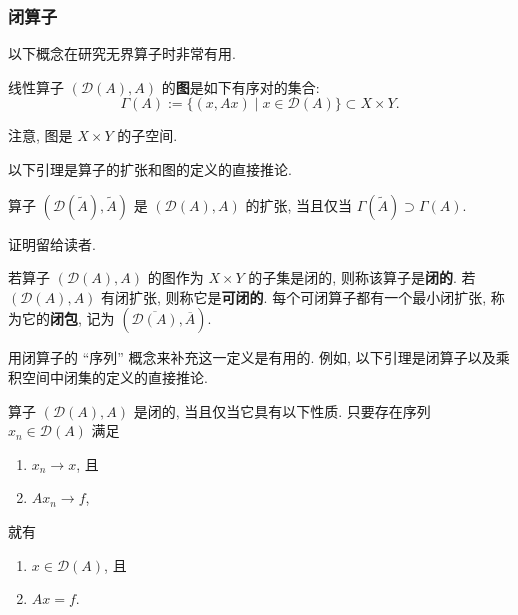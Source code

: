 \subsubsection{闭算子}\label{subsec:closed-operators}

以下概念在研究无界算子时非常有用.

\begin{Definition}
\label{def:linear-operator-graph}
线性算子 $(\mathcal{D}(A),A)$ 的\textbf{图}是如下有序对的集合:
\begin{equation}\label{eq:linear-operator-graph-definition}
\Gamma(A):=\{(x,Ax)\mid x\in\mathcal{D}(A)\}\subset X\times Y.
\end{equation}

\end{Definition}

注意, 图是 $X\times Y$ 的子空间.

以下引理是算子的扩张和图的定义的直接推论.

\begin{Lemma}
\label{lem:operator-extension-graph-inclusion}
算子 $(\mathcal{D}(\widetilde A),\widetilde A)$ 是 $(\mathcal{D}(A),A)$ 的扩张, 当且仅当 $\Gamma(\widetilde A)\supset\Gamma(A)$.
\end{Lemma}

证明留给读者.

\begin{Definition}
\label{def:closed-closable-operator-and-closure}
若算子 $(\mathcal{D}(A),A)$ 的图作为 $X\times Y$ 的子集是闭的, 则称该算子是\textbf{闭的}. 若 $(\mathcal{D}(A),A)$ 有闭扩张, 则称它是\textbf{可闭的}. 每个可闭算子都有一个最小闭扩张, 称为它的\textbf{闭包}, 记为 $(\overline{\mathcal{D}(A)},\overline A)$.
\end{Definition}

用闭算子的 ``序列'' 概念来补充这一定义是有用的. 例如, 以下引理是闭算子以及乘积空间中闭集的定义的直接推论.

\begin{Lemma}
\label{lem:closed-operator-sequential-criterion}
算子 $(\mathcal{D}(A),A)$ 是闭的, 当且仅当它具有以下性质. 只要存在序列 $x_n\in\mathcal{D}(A)$ 满足\begin{enumerate}\item $x_n\to x$, 且\item $Ax_n\to f$,\end{enumerate}就有\begin{enumerate}\item $x\in\mathcal{D}(A)$, 且\item $Ax=f$.\end{enumerate}
\end{Lemma}

